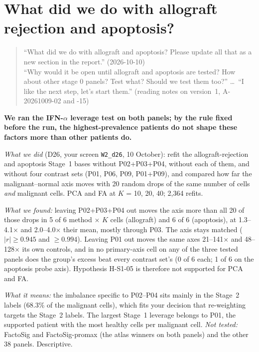 \section{What did we do with allograft rejection and apoptosis?}
\label{sec:d26}

\begin{quote}
``What did we do with allograft and apoptosis? Please update all that as a new section in the report.'' (2026-10-10)\\[2pt]
``Why would it be open until allograft and apoptosis are tested? How about other stage 0 panels? Test what? Should we test them too?'' \ldots\ ``I like the next step, let's start them.'' (reading notes on version~1, A-20261009-02 and -15)
\end{quote}

\begin{answerbox}
\textbf{We ran the IFN-$\alpha$ leverage test on both panels; by the rule fixed before the run, the highest-prevalence patients do not shape these factors more than other patients do.}
\par\smallskip\noindent \emph{What we did} (D26, your screen \texttt{W2\_d26}, 10 October): refit the allograft-rejection and apoptosis Stage~1 bases without P02+P03+P04, without each of them, and without four contrast sets (P01, P06, P09, P01+P09), and compared how far the malignant--normal axis moves with 20 random drops of the same number of cells \emph{and} malignant cells. PCA and FA at $K$ = 10, 20, 40; 2,364 refits.
\par\smallskip\noindent \emph{What we found:} leaving P02+P03+P04 out moves the axis more than all 20 of those drops in 5 of 6 method $\times$ $K$ cells (allograft) and 6 of 6 (apoptosis), at 1.3--4.1$\times$ and 2.0--4.0$\times$ their mean, mostly through P03. The axis stays matched ($|r| \geq 0.945$ and $\geq 0.994$). Leaving P01 out moves the same axes 21--141$\times$ and 48--128$\times$ its own controls, and in no primary-axis cell on any of the three tested panels does the group's excess beat every contrast set's (0 of 6 each; 1 of 6 on the apoptosis probe axis). Hypothesis H-S1-05 is therefore not supported for PCA and FA.
\par\smallskip\noindent \emph{What it means:} the imbalance specific to P02--P04 sits mainly in the Stage~2 labels (68.3\% of the malignant cells), which fits your decision that re-weighting targets the Stage~2 labels. The largest Stage~1 leverage belongs to P01, the supported patient with the most healthy cells per malignant cell. \emph{Not tested:} FactoSig and FactoSig-promax (the atlas winners on both panels) and the other 38 panels. Descriptive.
\end{answerbox}

